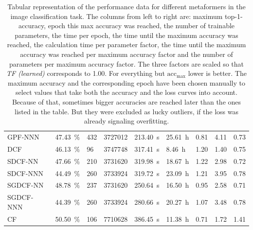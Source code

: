 \begin{table}[htbp]
{\begin{tabular}{l|llllllll}
            GPF-NNN & \SI{47.43}{\percent}  & \SI{432}{} & \SI{3727012}{} & \SI{213.40}{\second} & \SI{25.61}{\hour} & \SI{0.81}{} & \SI{4.11}{} & \SI{0.73}{} \\
            DCF & \SI{46.13}{\percent}  & \SI{96}{} & \SI{3747748}{} & \SI{317.41}{\second} & \SI{8.46}{\hour} & \SI{1.20}{} & \SI{1.40}{} & \SI{0.75}{} \\
            SDCF-NN & \SI{47.66}{\percent}  & \SI{210}{} & \SI{3731620}{} & \SI{319.98}{\second} & \SI{18.67}{\hour} & \SI{1.22}{} & \SI{2.98}{} & \SI{0.72}{} \\
            SDCF-NNN & \SI{44.49}{\percent}  & \SI{260}{} & \SI{3733924}{} & \SI{319.72}{\second} & \SI{23.09}{\hour} & \SI{1.21}{} & \SI{3.95}{} & \SI{0.78}{} \\
            SGDCF-NN & \SI{48.78}{\percent}  & \SI{237}{} & \SI{3731620}{} & \SI{250.64}{\second} & \SI{16.50}{\hour} & \SI{0.95}{} & \SI{2.58}{} & \SI{0.71}{} \\
            SGDCF-NNN & \SI{44.39}{\percent}  & \SI{260}{} & \SI{3733924}{} & \SI{280.66}{\second} & \SI{20.27}{\hour} & \SI{1.07}{} & \SI{3.48}{} & \SI{0.78}{} \\
            CF & \SI{50.50}{\percent}  & \SI{106}{} & \SI{7710628}{} & \SI{386.45}{\second} & \SI{11.38}{\hour} & \SI{0.71}{} & \SI{1.72}{} & \SI{1.41}{} \\
            \bottomrule
        \end{tabular}
    }
    \vspace{0.1cm}
    \caption{Tabular representation of the performance data for different metaformers in the image classification task.
            The columns from left to right are: maximum top-1-accuracy, epoch this max accuracy was reached, the number of trainable parameters, the time per epoch, the time until the maximum accuracy was reached, the calculation time per parameter factor, the time until the maximum accuracy was reached per maximum accuracy factor and the number of parameters per maximum accuracy factor.
            The three factors are scaled so that \emph{TF (learned)} corresponds to \SI{1.00}{}. For everything but $\mathrm{acc}_\mathrm{max}$ lower is better. The maximum accuracy and the corresponding epoch have been chosen manually to select values that take both the accuracy and the loss curves into account. Because of that, sometimes bigger accuracies are reached later than the ones listed in the table.
            But they were excluded as lucky outliers, if the loss was already signaling overfitting.
    }
    \label{table:overall-comparison-data}
\end{table}

